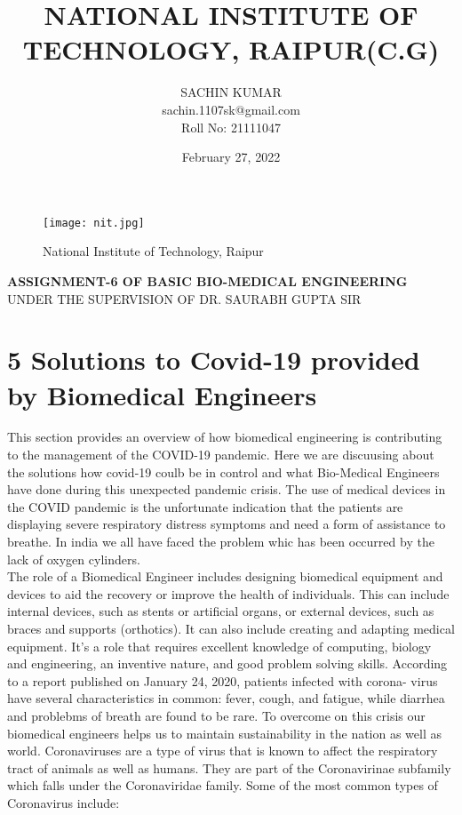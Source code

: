\documentclass[12pts]{article}
\title{\textbf{NATIONAL INSTITUTE OF TECHNOLOGY, RAIPUR(C.G)}}
\author{SACHIN KUMAR\\sachin.1107sk@gmail.com\\Roll No: 21111047}
\date{February 27, 2022}
\begin{document}
\maketitle

\begin{figure}[h]
\centering
\texttt{[image: nit.jpg]}
\caption{National Institute of Technology, Raipur}
\end{figure}

\textbf{ASSIGNMENT-6 OF BASIC BIO-MEDICAL ENGINEERING}\\
\centering
UNDER THE SUPERVISION OF DR. SAURABH GUPTA SIR\\

\clearpage



\section*{5 Solutions to Covid-19 provided by Biomedical Engineers}



This section provides an overview of how biomedical engineering is contributing to the management of the COVID-19 pandemic.
Here we are discuusing about the solutions how covid-19 coulb be in control and what Bio-Medical Engineers have done during this unexpected pandemic crisis.
The use of medical devices in the COVID pandemic is the unfortunate indication that the patients are displaying severe respiratory distress symptoms and need a form of assistance to breathe.
In india we all have faced the problem whic has been occurred by the lack of oxygen cylinders.\\
The role of a Biomedical Engineer includes designing biomedical equipment and devices to aid the recovery or improve the health of individuals. This can include internal devices, such as stents or artificial organs, or external devices, such as braces and supports (orthotics). It can also include creating and adapting medical equipment. It’s a role that requires excellent knowledge of computing, biology and engineering, an inventive nature, and good problem solving skills.
According to a report published on January 24, 2020, patients infected with corona-
virus have several characteristics in common: fever, cough, and fatigue, while diarrhea and problebms of breath are found to be rare. To overcome on this crisis our biomedical engineers helps us to maintain sustainability in the nation as well as world. 
Coronaviruses are a type of virus that is known to affect the respiratory tract of animals as well as humans. They are part of the Coronavirinae subfamily which falls under the Coronaviridae family. Some of the most common types of Coronavirus include:\\
\end{document}
